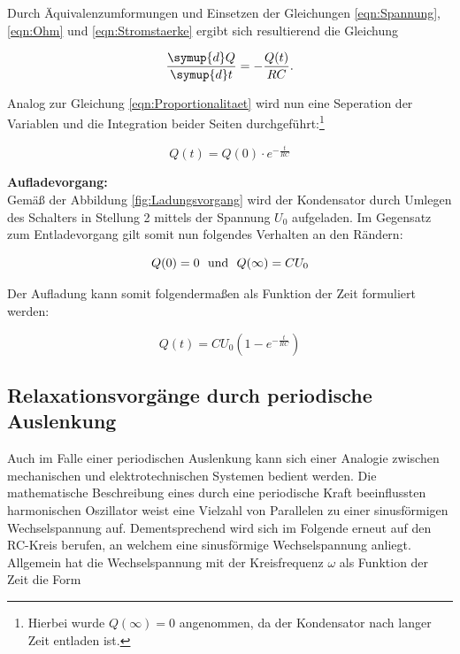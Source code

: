 \noindent Durch Äquivalenzumformungen und Einsetzen der Gleichungen \eqref{eqn:Spannung}, \eqref{eqn:Ohm} und \eqref{eqn:Stromstaerke} ergibt sich 
resultierend die Gleichung

\begin{equation}
    \frac{\symup{d}Q}{\symup{d}t} = -\frac{Q(t)}{RC}.
\end{equation}

\noindent Analog zur Gleichung \eqref{eqn:Proportionalitaet} wird nun eine Seperation der Variablen und die Integration beider
Seiten durchgeführt:\footnote{Hierbei wurde $Q(\infty) = 0$ angenommen, da der Kondensator nach langer Zeit
entladen ist.}

\begin{equation}
    Q(t) = Q(0) \cdot e^{-\frac{t}{RC}}
    \label{eqn:Entladung}
\end{equation}

\noindent \textbf{Aufladevorgang:}\\
Gemäß der Abbildung \ref{fig:Ladungsvorgang} wird der Kondensator durch Umlegen des Schalters in Stellung 2 mittels der Spannung
$U_0$ aufgeladen. Im Gegensatz zum Entladevorgang gilt somit nun folgendes Verhalten an den Rändern:

\begin{equation*}
    Q(0) =0 \,\,\,\,\text{und}\,\,\,\, Q(\infty)= CU_0\\
\end{equation*}

\noindent Der Aufladung kann somit folgendermaßen als Funktion der Zeit formuliert werden:

\begin{equation}
    Q(t) = CU_0\left(1 - e^{-\frac{t}{RC}}\right)
\end{equation}

\subsection{Relaxationsvorgänge durch periodische Auslenkung}

Auch im Falle einer periodischen Auslenkung kann sich einer Analogie zwischen mechanischen und elektrotechnischen Systemen
bedient werden. Die mathematische Beschreibung eines durch eine periodische Kraft beeinflussten harmonischen Oszillator weist
eine Vielzahl von Parallelen zu einer sinusförmigen Wechselspannung auf. Dementsprechend wird sich im Folgende erneut auf den
RC-Kreis berufen, an welchem eine sinusförmige Wechselspannung anliegt.\\
Allgemein hat die Wechselspannung mit der Kreisfrequenz $\omega$ als Funktion der Zeit die Form

